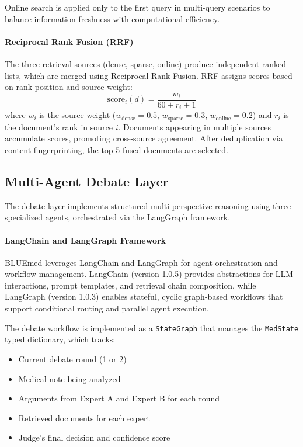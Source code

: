 \documentclass[11pt]{article}
\begin{document}
Online search is applied only to the first query in multi-query scenarios to balance information freshness with computational efficiency.

\paragraph{Reciprocal Rank Fusion (RRF)}
The three retrieval sources (dense, sparse, online) produce independent ranked lists, which are merged using Reciprocal Rank Fusion. RRF assigns scores based on rank position and source weight:
\begin{equation}
    \text{score}_i(d) = \frac{w_i}{60 + r_i + 1}
\end{equation}
where $w_i$ is the source weight ($w_{\text{dense}}=0.5$, $w_{\text{sparse}}=0.3$, $w_{\text{online}}=0.2$) and $r_i$ is the document's rank in source $i$. Documents appearing in multiple sources accumulate scores, promoting cross-source agreement. After deduplication via content fingerprinting, the top-5 fused documents are selected.

\subsection{Multi-Agent Debate Layer}

The debate layer implements structured multi-perspective reasoning using three specialized agents, orchestrated via the LangGraph framework.

\paragraph{LangChain and LangGraph Framework}
BLUEmed leverages LangChain and LangGraph for agent orchestration and workflow management. LangChain (version 1.0.5) provides abstractions for LLM interactions, prompt templates, and retrieval chain composition, while LangGraph (version 1.0.3) enables stateful, cyclic graph-based workflows that support conditional routing and parallel agent execution.

The debate workflow is implemented as a \texttt{StateGraph} that manages the \texttt{MedState} typed dictionary, which tracks:
\begin{itemize}
    \item Current debate round (1 or 2)
    \item Medical note being analyzed
    \item Arguments from Expert A and Expert B for each round
    \item Retrieved documents for each expert
    \item Judge's final decision and confidence score
\end{itemize}
\end{document}
